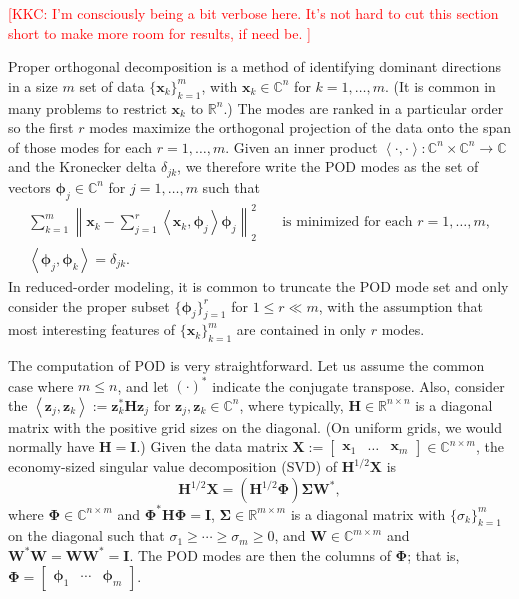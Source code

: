 \documentclass[11pt]{article}
\newcommand*{\Complex}{\mathbb{C}}
\newcommand*{\Reals}{\mathbb{R}}
\newcommand*{\half}{^{1/2}}
\newcommand*{\ip}[2]{\left<#1, #2\right>}
\renewcommand*{\H}{\mathbf{H}}
\newcommand*{\I}{\mathbf{I}}
\newcommand*{\X}{\mathbf{X}}
\newcommand*{\W}{\mathbf{W}}
\newcommand*{\PHI}{\mathbf{\Phi}}
\newcommand*{\SIGMA}{\mathbf{\Sigma}}
\newcommand*{\x}{\mathbf{x}}
\newcommand*{\z}{\mathbf{z}}
\newcommand*{\phiv}{\bm{\phi}}
\newcommand{\kkc}[1]{\textcolor{red}{[KKC: #1]}}
\begin{document}
\kkc{%
    I'm consciously being a bit verbose here.
    It's not hard to cut this section short to make more room for results, if need be.%
}

Proper orthogonal decomposition \citep{SirovichQAM87, HolmesTCSDSS} is a method of identifying dominant directions in a size $m$ set of data $\{\x_k\}_{k=1}^m$, with $\x_k \in \Complex^n$ for $k = 1, \ldots, m$.
(It is common in many problems to restrict $\x_k$ to $\Reals^n$.)
The modes are ranked in a particular order so the first $r$ modes maximize the orthogonal projection of the data onto the span of those modes for each $r = 1, \ldots, m$.
Given an inner product $\ip{\cdot}{\cdot} : \Complex^n \times \Complex^n \to \Complex$ and the Kronecker delta $\delta_{jk}$, we therefore write the POD modes as the set of vectors $\phiv_j \in \Complex^n$ for $j = 1, \ldots, m$ such that
\begin{subequations}
    \begin{align}
        \sum_{k=1}^m \left\|\x_k - \sum_{j=1}^r \ip{\x_k}{\phiv_j} \phiv_j \right\|_2^2 \quad & \text{is minimized for each } r = 1, \ldots, m, \\
        \ip{\phiv_j}{\phiv_k} = \delta_{jk}.
    \end{align}
\end{subequations}
In reduced-order modeling, it is common to truncate the POD mode set and only consider the proper subset $\{\phiv_j\}_{j=1}^r$ for $1 \le r \ll m$, with the assumption that most interesting features of $\{\x_k\}_{k=1}^m$ are contained in only $r$ modes.

The computation of POD is very straightforward.
Let us assume the common case where $m \le n$, and let $(\cdot)^*$ indicate the conjugate transpose.
Also, consider the $\ip{\z_j}{\z_k} := \z_k^* \H \z_j$ for $\z_j, \z_k \in \Complex^n$, where typically, $\H \in \Reals^{n \times n}$ is a diagonal matrix with the positive grid sizes on the diagonal.
(On uniform grids, we would normally have $\H = \I$.)
Given the data matrix $\X := \begin{bmatrix} \x_1 & \ldots & \x_m \end{bmatrix} \in \Complex^{n \times m}$, the economy-sized singular value decomposition (SVD) of $\H\half \X$ is
\begin{equation}
    \label{eq:svd}
    \H\half \X = (\H\half\PHI) \SIGMA \W^*,
\end{equation}
where $\PHI \in \Complex^{n \times m}$ and $\PHI^* \H \PHI = \I$, $\SIGMA \in \Reals^{m \times m}$ is a diagonal matrix with $\{\sigma_k\}_{k=1}^m$ on the diagonal such that $\sigma_1 \ge \cdots \ge \sigma_m \ge 0$, and $\W \in \Complex^{m \times m}$ and $\W^* \W = \W \W^* = \I$.
The POD modes are then the columns of $\PHI$; that is, $\PHI = \begin{bmatrix} \phiv_1 & \cdots & \phiv_m \end{bmatrix}$.
\end{document}
